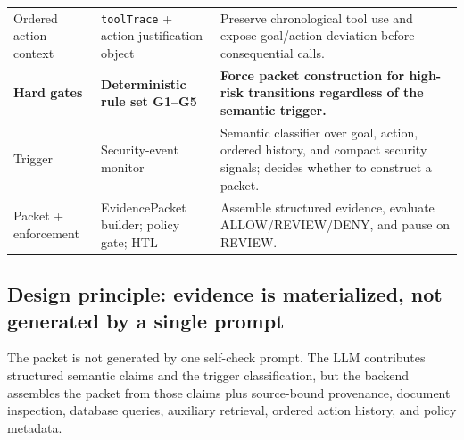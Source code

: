 \documentclass[conference]{IEEEtran}
\newcommand{\addtext}[1]{\textbf{#1}}
\begin{document}
\begin{table}[ht!]
\begin{tabularx}{\textwidth}{p{3.2cm} p{5.2cm} X}
Ordered action context
& \texttt{toolTrace} + action-justification object
& Preserve chronological tool use and expose goal/action deviation before consequential calls. \\

\addtext{Hard gates}
& \addtext{Deterministic rule set G1--G5}
& \addtext{Force packet construction for high-risk transitions regardless of the semantic trigger.} \\

Trigger
& Security-event monitor
& Semantic classifier over goal, action, ordered history, and compact security signals; decides whether to construct a packet. \\

Packet + enforcement
& EvidencePacket builder; policy gate; HTL
& Assemble structured evidence, evaluate \textsc{ALLOW}/\textsc{REVIEW}/\textsc{DENY}, and pause on \textsc{REVIEW}. \\

\hline
\end{tabularx}
\end{table}

\subsection{Design principle: evidence is materialized, not generated by a single prompt}
The packet is not generated by one self-check prompt. The LLM contributes structured semantic claims and the trigger classification, but the backend assembles the packet from those claims plus source-bound provenance, document inspection, database queries, auxiliary retrieval, ordered action history, and policy metadata.
\end{document}

